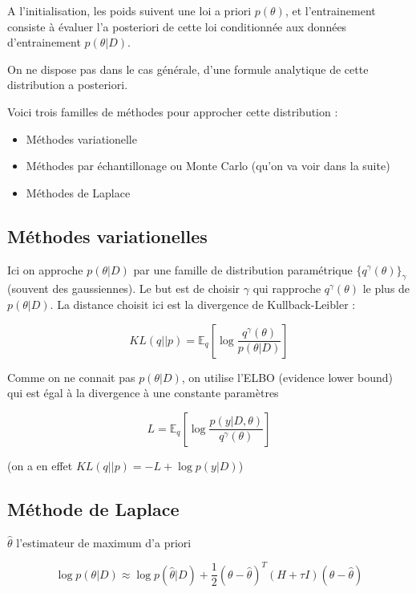 \documentclass[french,12pt]{article}
\begin{document}
A l'initialisation, les poids suivent une loi a priori $p(\theta)$,
et l'entrainement consiste à évaluer l'a posteriori de cette loi conditionnée
aux données d'entrainement $p(\theta | D)$.


On ne dispose pas dans le cas générale, d'une formule analytique de cette
distribution a posteriori.

Voici trois familles de méthodes pour approcher cette distribution :


\begin{itemize}
    \item Méthodes variationelle
    \item Méthodes par échantillonage ou
          Monte Carlo (qu'on va voir dans la suite)
    \item Méthodes de Laplace
\end{itemize}


\subsection{Méthodes variationelles}

Ici on approche $p(\theta | D)$ par une famille de distribution
paramétrique $\{q^{\gamma}(\theta)\}_{\gamma}$ (souvent des gaussiennes).
Le but est de choisir $\gamma$ qui rapproche $q^{\gamma}(\theta)$
le plus de $p(\theta | D)$. La distance choisit ici est la divergence
de Kullback-Leibler :

$$KL(q||p) = \mathbb{E}_q \left[\log \frac{q^{\gamma}(\theta)}{p(\theta | D)}\right]$$

Comme on ne connait pas $p(\theta | D)$, on utilise l'ELBO (evidence lower bound)
qui est égal à la divergence à une constante paramètres

$$L =\mathbb{E}_q \left[\log \frac{p(y | D, \theta)}{q^{\gamma}(\theta)}\right]$$

(on a en effet $KL(q||p) = -L +  \log p(y| D)$)

\subsection{Méthode de Laplace}

$\hat{\theta}$ l'estimateur de maximum d'a priori

$$\log p(\theta | D) \approx \log p(\hat{\theta} | D)
    + \frac{1}{2} (\theta - \hat{\theta})^T (H + \tau I)
    (\theta - \hat{\theta})$$
\end{document}
